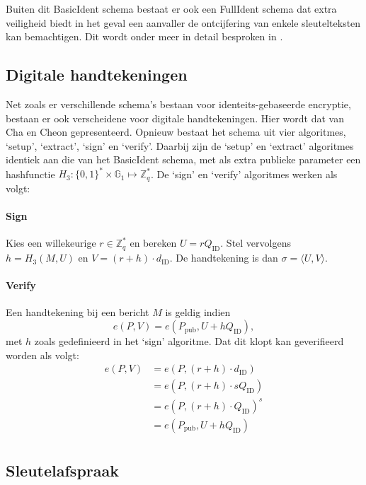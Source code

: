 Buiten dit BasicIdent schema bestaat er ook een FullIdent schema dat extra veiligheid biedt in het geval een aanvaller de ontcijfering van enkele sleutelteksten kan bemachtigen. Dit wordt onder meer in detail besproken in \cite{maas}.

\subsection{Digitale handtekeningen}

Net zoals er verschillende schema's bestaan voor identeits-gebaseerde  encryptie, bestaan er ook verscheidene voor digitale handtekeningen. Hier wordt dat van Cha en Cheon \cite{cha} gepresenteerd. Opnieuw bestaat het schema uit vier algoritmes, `setup', `extract', `sign' en `verify'. Daarbij zijn de `setup' en `extract' algoritmes identiek aan die van het BasicIdent schema, met als extra publieke parameter een hashfunctie $H_3 : \{ 0,1 \} ^* \times \mathbb{G}_1 \mapsto \mathbb{Z}_q ^*$. De `sign' en `verify' algoritmes werken als volgt:

\paragraph{Sign} Kies een willekeurige $r \in \mathbb{Z}_q^*$ en bereken $U = r Q_{\text{ID}}$. Stel vervolgens $h = H_3(M, U)$ en $V = (r + h) \cdot d_{\text{ID}}$. De handtekening is dan $\sigma = \langle U, V \rangle$.

\paragraph{Verify} Een handtekening bij een bericht $M$ is geldig indien
\[e(P, V) = e(P_{\text{pub}}, U + h Q_{\text{ID}}),\]
met $h$ zoals gedefinieerd in het `sign' algoritme. Dat dit klopt kan geverifieerd worden als volgt:
\[\begin{aligned}
e(P, V)	&= e(P, (r + h) \cdot d_{\text{ID}})\\
			&= e(P, (r + h) \cdot s Q_{\text{ID}})\\
			&= e(P, (r + h) \cdot Q_{\text{ID}})^s\\
			&= e(P_{\text{pub}}, U + h Q_{\text{ID}})\\
\end{aligned}\]

\subsection{Sleutelafspraak}

